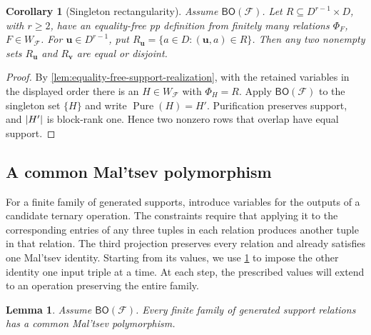 \documentclass[11pt,letterpaper,onecolumn]{article}
\theoremstyle{plain}
\newtheorem{lemma}[lemma]{Lemma}
\newtheorem{corollary}[corollary]{Corollary}
\theoremstyle{definition}
\theoremstyle{remark}
\newcommand{\cF}{\mathcal F}
\newcommand{\BO}{\mathsf{BO}}
\newcommand{\SuppRel}[1]{\Phi_{#1}}
\DeclareMathOperator{\Pure}{Pure}
\DeclarePairedDelimiter{\abs}{\lvert}{\rvert}
\begin{document}
\begin{corollary}[Singleton rectangularity]
\label{cor:generated-singleton-rectangularity}
Assume $\BO(\cF)$.  Let $R\subseteq D^{r-1}\times D$, with $r\ge2$, have an
equality-free pp definition from finitely many relations $\SuppRel F$,
$F\in W_{\cF}$.  For $\mathbf u\in D^{r-1}$, put $R_{\mathbf u}=\{a\in D:(\mathbf u,a)\in R\}$. Then any two nonempty sets $R_{\mathbf u}$ and $R_{\mathbf v}$ are equal or
disjoint.
\end{corollary}

\begin{proof}
By \cref{lem:equality-free-support-realization}, with the retained variables in the displayed order there is an $H\in W_{\cF}$ with $\SuppRel H=R$.  Apply $\BO(\cF)$ to
the singleton set $\{H\}$ and write $\Pure(H)=H'$.  Purification
preserves support, and $\abs{H'}$ is block-rank one.  Hence two
nonzero rows that overlap have equal support.
\end{proof}

\subsection{A common Mal'tsev polymorphism}

For a finite family of generated supports, introduce variables for the
outputs of a candidate ternary operation.  The constraints require that
applying it to the corresponding entries of any three tuples in each
relation produces another tuple in that relation.
The third projection preserves every relation and already satisfies
one Mal'tsev identity.  Starting from its values, we use
\cref{cor:generated-singleton-rectangularity} to impose the other identity
one input triple at a time.  At each step, the prescribed values will
extend to an operation preserving the entire family.

\begin{lemma}
\label{lem:finite-support-maltsev}
Assume $\BO(\cF)$.  Every finite family of generated support relations has a
common Mal'tsev polymorphism.
\end{lemma}
\end{document}
